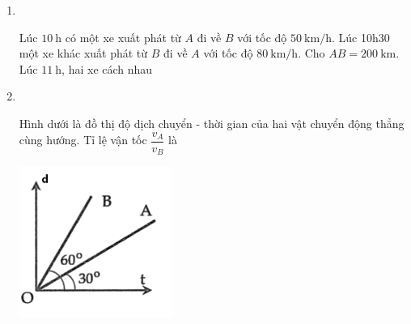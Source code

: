 \begin{enumerate}[label=\bfseries Câu \arabic*:,leftmargin=1.5cm]
\item {}\\
{Lúc $\SI{10}{\hour}$ có một xe xuất phát từ $A$ đi về $B$ với tốc độ $\SI{50}{\kilo\meter/\hour}$. Lúc 10h30 một xe khác xuất phát từ $B$ đi về $A$ với tốc độ $\SI{80}{\kilo\meter/\hour}$. Cho $AB =\SI{200}{\kilo\meter}$. Lúc $\SI{11}{\hour}$, hai xe cách nhau
}

\item {}\\
{\begin{minipage}[l]{0.6\textwidth}
		Hình dưới là đồ thị độ dịch chuyển - thời gian của hai vật chuyển động thẳng cùng hướng. Tỉ lệ vận tốc $\dfrac{v_A}{v_B}$ là
	\end{minipage}
	\begin{minipage}{0.4\textwidth}
		\begin{center}
			\includegraphics[width=0.4\linewidth]{../figs/VN10-2023-PH-TP005-P-8}
		\end{center}
	\end{minipage}
}


\end{enumerate}
